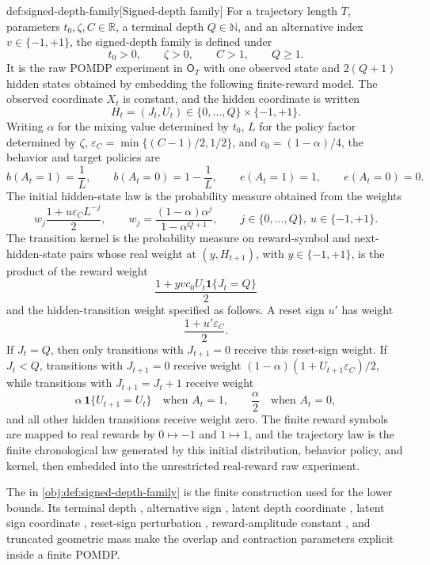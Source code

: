 \begin{definitionv}{def:signed-depth-family}[Signed-depth family]
For a trajectory length \(T\), parameters \(t_0,\zeta,C\in\mathbb R\), a terminal depth \(Q\in\mathbb N\), and an alternative index \(v\in\{-1,+1\}\), the signed-depth family is defined under
\[
t_0>0,\qquad \zeta>0,\qquad C>1,\qquad Q\ge 1.
\]
It is the raw POMDP experiment in \(\mathsf O_T\) with one observed state and \(2(Q+1)\) hidden states obtained by embedding the following finite-reward model.  The observed coordinate \(X_t\) is constant, and the hidden coordinate is written
\[
H_t=(J_t,U_t)\in\{0,\ldots,Q\}\times\{-1,+1\}.
\]
Writing \(\alpha\) for the mixing value determined by \(t_0\), \(L\) for the policy factor determined by \(\zeta\), \(\varepsilon_C=\min\{(C-1)/2,1/2\}\), and \(c_0=(1-\alpha)/4\), the behavior and target policies are
\[
b(A_t=1)=\frac{1}{L},\qquad b(A_t=0)=1-\frac{1}{L},
\qquad
e(A_t=1)=1,\qquad e(A_t=0)=0.
\]
The initial hidden-state law is the probability measure obtained from the weights
\[
w_j\frac{1+u\varepsilon_C L^{-j}}{2},
\qquad
w_j=
\frac{(1-\alpha)\alpha^j}{1-\alpha^{Q+1}},
\qquad
j\in\{0,\ldots,Q\},\ u\in\{-1,+1\}.
\]
The transition kernel is the probability measure on reward-symbol and next-hidden-state pairs whose real weight at \((y,H_{t+1})\), with \(y\in\{-1,+1\}\), is the product of the reward weight
\[
\frac{1+yvc_0U_t\mathbf 1\{J_t=Q\}}{2}
\]
and the hidden-transition weight specified as follows.  A reset sign \(u'\) has weight
\[
\frac{1+u'\varepsilon_C}{2}.
\]
If \(J_t=Q\), then only transitions with \(J_{t+1}=0\) receive this reset-sign weight.  If \(J_t<Q\), transitions with \(J_{t+1}=0\) receive weight \((1-\alpha)(1+U_{t+1}\varepsilon_C)/2\), while transitions with \(J_{t+1}=J_t+1\) receive weight
\[
\alpha\,\mathbf 1\{U_{t+1}=U_t\}
\quad\text{when }A_t=1,
\qquad
\frac{\alpha}{2}
\quad\text{when }A_t=0,
\]
and all other hidden transitions receive weight zero.  The finite reward symbols are mapped to real rewards by \(0\mapsto -1\) and \(1\mapsto 1\), and the trajectory law is the finite chronological law generated by this initial distribution, behavior policy, and kernel, then embedded into the unrestricted real-reward raw experiment.
\end{definitionv}

The  in \cref{obj:def:signed-depth-family} is the finite construction used for the lower bounds. Its terminal depth , alternative sign , latent depth coordinate , latent sign coordinate , reset-sign perturbation , reward-amplitude constant , and truncated geometric mass  make the overlap and contraction parameters explicit inside a finite POMDP.
